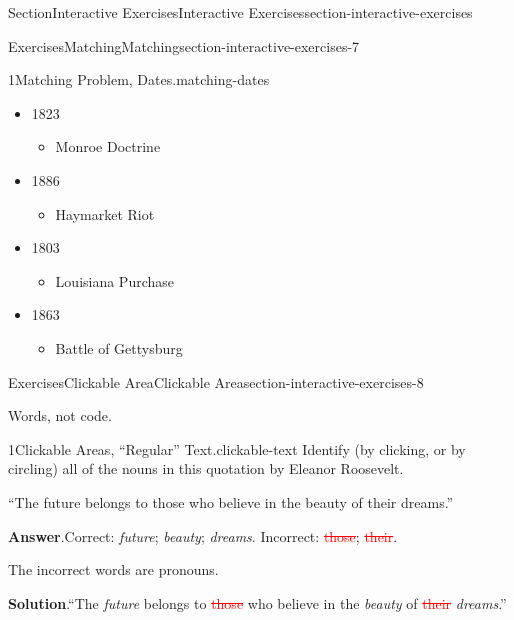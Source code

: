 \documentclass[twoside,10pt,]{article}
\newcommand{\blocktitlefont}{\relax}
\newcommand{\deletethick}{.25ex}
\newcommand{\deleted}[1]{\renewcommand{\ULthickness}{\deletethick}\textcolor{red}{\sout{#1}}}
\numberwithin{equation}{section}
\begin{document}
\begin{sectionptx}{Section}{Interactive Exercises}{}{Interactive Exercises}{}{}{section-interactive-exercises}
\begin{exercises-subsection}{Exercises}{Matching}{}{Matching}{}{}{section-interactive-exercises-7}
\begin{divisionexercise}{1}{Matching Problem, Dates.}{}{matching-dates}
\begin{itemize}[label=\textbullet]
\item{}1823%
\begin{itemize}[label=$\circ$]
\item{}Monroe Doctrine%
\end{itemize}
%
\item{}1886%
\begin{itemize}[label=$\circ$]
\item{}Haymarket Riot%
\end{itemize}
%
\item{}1803%
\begin{itemize}[label=$\circ$]
\item{}Louisiana Purchase%
\end{itemize}
%
\item{}1863%
\begin{itemize}[label=$\circ$]
\item{}Battle of Gettysburg%
\end{itemize}
%
\end{itemize}
%
\end{divisionexercise}%
\end{exercises-subsection}
%
%
\typeout{************************************************}
\typeout{************************************************}
%
\begin{exercises-subsection}{Exercises}{Clickable Area}{}{Clickable Area}{}{}{section-interactive-exercises-8}
\begin{introduction}{}%
Words, not code.%
\end{introduction}%
\begin{divisionexercise}{1}{Clickable Areas, ``Regular'' Text.}{}{clickable-text}%
Identify (by clicking, or by circling) all of the nouns in this quotation by Eleanor Roosevelt.%
\par
``The future belongs to those who believe in the beauty of their dreams.''%
\par\smallskip%
\noindent\textbf{\blocktitlefont Answer}.\hypertarget{clickable-text-3}{}\quad{}Correct: \emph{future}; \emph{beauty}; \emph{dreams}. Incorrect: \deleted{those}; \deleted{their}.%
\par
The incorrect words are pronouns.%
\par\smallskip%
\noindent\textbf{\blocktitlefont Solution}.\hypertarget{clickable-text-4}{}\quad{}``The \emph{future} belongs to \deleted{those} who believe in the \emph{beauty} of \deleted{their} \emph{dreams}.''%
\end{divisionexercise}%

\end{exercises-subsection}
\end{sectionptx}
\end{document}
